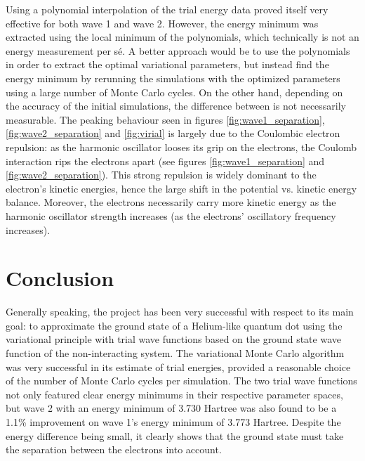 \documentclass[nofootinbib,reprint,english]{revtex4-1}
\begin{document}
Using a polynomial interpolation of the trial energy data proved itself very effective for both wave 1 and wave 2. However, the energy minimum was extracted using the local minimum of the polynomials, which technically is not an energy measurement per sé. A better approach would be to use the polynomials in order to extract the optimal variational parameters, but instead find the energy minimum by rerunning the simulations with the optimized parameters using a large number of Monte Carlo cycles. On the other hand, depending on the accuracy of the initial simulations, the difference between is not necessarily measurable.
\newpage
The peaking behaviour seen in figures \ref{fig:wave1_separation}, \ref{fig:wave2_separation} and \ref{fig:virial} is largely due to the Coulombic electron repulsion: as the harmonic oscillator looses its grip on the electrons, the Coulomb interaction rips the electrons apart (see figures \ref{fig:wave1_separation} and \ref{fig:wave2_separation}). This strong repulsion is widely dominant to the electron's kinetic energies, hence the large shift in the potential vs. kinetic energy balance. Moreover, the electrons necessarily carry more kinetic energy as the harmonic oscillator strength increases (as the electrons' oscillatory frequency increases).

\section{Conclusion}
Generally speaking, the project has been very successful with respect to its main goal: to approximate the ground state of a Helium-like quantum dot using the variational principle with trial wave functions based on the ground state wave function of the non-interacting system. The variational Monte Carlo algorithm was very successful in its estimate of trial energies, provided a reasonable choice of the number of Monte Carlo cycles per simulation. The two trial wave functions not only featured clear energy minimums in their respective parameter spaces, but wave 2 with an energy minimum of 3.730 Hartree was also found to be a 1.1\% improvement on wave 1's energy minimum of 3.773 Hartree. Despite the energy difference being small, it clearly shows that the ground state must take the separation between the electrons into account.



%

\end{document}
